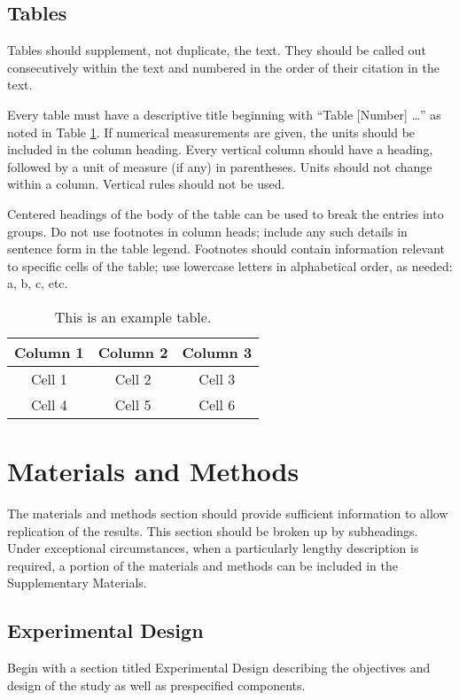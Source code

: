 \documentclass{article}
\begin{document}
\subsection*{Tables}
Tables should supplement, not duplicate, the text. They should be called out consecutively within the text and numbered in the order of their citation in the text. 

Every table must have a descriptive title beginning with ``Table [Number] …'' as noted in Table \ref{tab:1}. If numerical measurements are given, the units should be included in the column heading. Every vertical column should have a heading, followed by a unit of measure (if any) in parentheses. Units should not change within a column. Vertical rules should not be used. 

Centered headings of the body of the table can be used to break the entries into groups. Do not use footnotes in column heads; include any such details in sentence form in the table legend. Footnotes should contain information relevant to specific cells of the table; use lowercase letters in alphabetical order, as needed: a, b, c, etc.

\begin{table}[b]
    \caption{This is an example table.}    
    \centering
    \begin{tabular}{ccc}
            \hline
            Column 1 & Column 2 & Column 3 \\  
            \hline
            Cell 1 & Cell 2 & Cell 3\\ 
            Cell 4 & Cell 5 & Cell 6 \\
            \hline
            \end{tabular}

    \label{tab:1}
\end{table}

\section{Materials and Methods}
The materials and methods section should provide sufficient information to allow replication of the results. This section should be broken up by subheadings. Under exceptional circumstances, when a particularly lengthy description is required, a portion of the materials and methods can be included in the Supplementary Materials. 

\subsection{Experimental Design}
Begin with a section titled Experimental Design describing the objectives and design of the study as well as prespecified components. 
\end{document}
